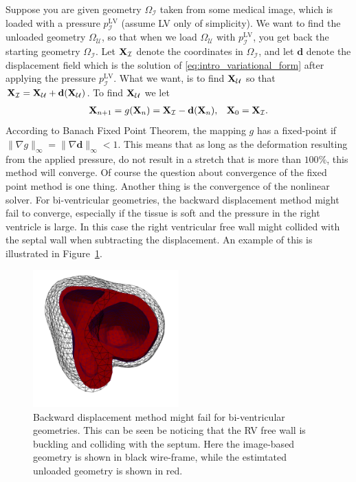 Suppose you are given geometry $\Omega_{\mathcal{I}}$ taken from some
medical image, which is loaded with a pressure $p_{\mathcal{I}}^{\mathrm{LV}}$ (assume LV only of
simplicity). We want to find the unloaded geometry 
$\Omega_{\mathcal{U}}$, so that when we load $\Omega_{\mathcal{U}}$ with $p_{\mathcal{I}}^{\mathrm{LV}}$,
you get back the starting geometry $\Omega_{\mathcal{I}}$. Let
$\mathbf{X}_{\mathcal{I}}$ denote the coordinates in $\Omega_{\mathcal{I}}$, and
let $\mathbf{d}$ denote the displacement field which is the solution
of \eqref{eq:intro_variational_form} after applying the pressure
$p_{\mathcal{I}}^{\mathrm{LV}}$. What we want, is to find
$\mathbf{X}_{\mathcal{U}}$ so that $\mathbf{X}_{\mathcal{I}} =
\mathbf{X}_{\mathcal{U}} + \mathbf{d}(\mathbf{X}_{\mathcal{U}})$. To find
$\mathbf{X}_{\mathcal{U}}$ we let 
\begin{align}
  \mathbf{X}_{n+1} = g(\mathbf{X}_n) =  \mathbf{X}_{\mathcal{I}} - \mathbf{d}(\mathbf{X}_n),
  && \mathbf{X}_0 = \mathbf{X}_{\mathcal{I}}.
\end{align}
According to Banach Fixed Point Theorem, the mapping $g$ has a
fixed-point if $\| \nabla g \|_{\infty} = \| \nabla \mathbf{d}
\|_{\infty} < 1$. This means that as long as the deformation
resulting from the applied pressure, do not result in a stretch that
is more than $100 \%$, this method will converge. Of course the
question about convergence of the fixed point method is one
thing. Another thing is the convergence of the nonlinear solver.
For bi-ventricular geometries, the backward displacement method might
fail to converge, especially if the tissue is soft and the pressure in
the right ventricle is large. In this case the
right ventricular free wall might collided with the septal wall when
subtracting the displacement. An example of this is illustrated in
Figure~\ref{fig:unloading_fail}.


\begin{figure}[htbp]
  \centering
    \includegraphics[width=0.5\textwidth]{chapters/introduction/figures/unloading_fail/unloading_fail.png}
\caption{Backward displacement method might fail for bi-ventricular
  geometries. This can be seen be noticing that the RV free wall is
  buckling and colliding with the septum. Here the image-based
  geometry is shown in black wire-frame, while the estimtated unloaded
geometry is shown in red.}
\label{fig:unloading_fail}
\end{figure}

